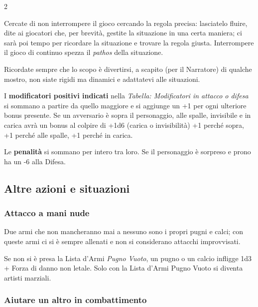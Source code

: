 \begin{multicols}{2}

\begin{narratore}
Cercate di non interrompere il gioco cercando la regola precisa: lasciatelo fluire, dite ai giocatori che, per brevità, gestite la situazione in una certa maniera; ci sarà poi tempo per ricordare la situazione e trovare la regola giusta. Interrompere il gioco di continuo spezza il \emph{pathos} della situazione.
\end{narratore}

\begin{narratore}
	Ricordate sempre che lo scopo è divertirsi, a scapito (per il Narratore) di qualche mostro, non siate rigidi ma dinamici e adattatevi alle situazioni.
\end{narratore}

I \textbf{modificatori positivi indicati} nella \emph{Tabella: Modificatori in attacco o difesa} si sommano a partire da quello maggiore e si aggiunge un +1 per ogni ulteriore bonus presente. Se un avversario è sopra il personaggio, alle spalle, invisibile e in carica avrà un bonus al colpire di +1d6 (carica o invisibilità) +1 perché sopra, +1 perché alle spalle, +1 perché in carica.

Le \textbf{penalità} si sommano per intero tra loro. Se il personaggio è sorpreso e prono ha un -6 alla Difesa.


\subsection{Altre azioni e situazioni} \label{AltreAzioni}

\subsubsection{Attacco a mani nude}  \label{attaccomaninude}

Due armi che non mancheranno mai a nessuno sono i propri pugni e calci; con queste armi ci si è sempre allenati e non si considerano attacchi improvvisati.

Se non si è presa la Lista d'Armi \emph{Pugno Vuoto}, un pugno o un calcio infligge 1d3 + Forza di danno non letale. Solo con la Lista d'Armi Pugno Vuoto si diventa artisti marziali.

\subsubsection{Aiutare un altro in combattimento}\label{aiutare}\hypertarget{aiutare}{}


\end{multicols}
